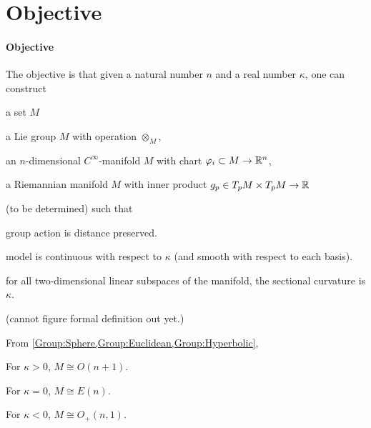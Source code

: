 \documentclass[../main.tex]{subfiles}
\begin{document}
\section{Objective}
\paragraph{Objective}\label{Objective}
The objective is that
given a natural number $n$ and a real number $\kappa$,
one can construct
\begin{APAenumerate}
    \item a set $M$
    \item a Lie group $M$ with operation $\otimes_M$,
    \item an $n$-dimensional $C^\infty$-manifold $M$ with chart $\varphi_i \subset M\to\mathbb{R}^n$,
    \item a Riemannian manifold $M$ with inner product $g_p\in T_pM\times T_pM\to\mathbb{R}$
\end{APAenumerate}
(to be determined)
such that
\begin{APAitemize}
    \item group action is distance preserved.
    \item model is continuous with respect to $\kappa$ (and smooth with respect to each basis).
    \item for all two-dimensional linear subspaces of the manifold, the sectional curvature is $\kappa$.
\end{APAitemize}
(cannot figure formal definition out yet.)

\begin{conjecture}\label{GeometricGroupStructure}
    From \cref{Group:Sphere,Group:Euclidean,Group:Hyperbolic},
    \begin{APAitemize}
        \item For $\kappa>0$, $M\cong O\left(n+1\right)$.
        \item For $\kappa=0$, $M\cong E\left(n\right)$.
        \item For $\kappa<0$, $M\cong O_{+}\left(n,1\right)$.
    \end{APAitemize}
\end{conjecture}
\end{document}

